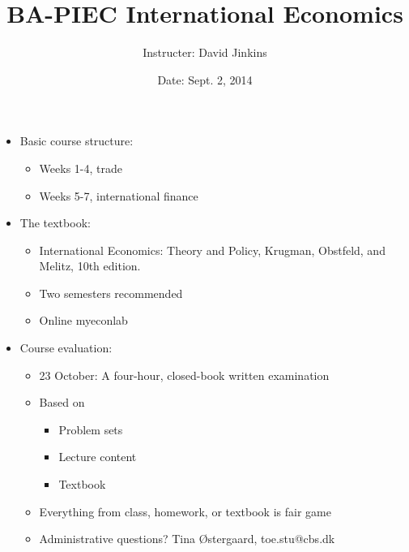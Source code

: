 \documentclass[ignorenonframetext,]{beamer}
\title{BA-PIEC International Economics}
\author{Instructer: David Jinkins}
\date{Date: Sept. 2, 2014}
\begin{document}
\frame{\titlepage}

\begin{frame}

\begin{itemize}
\itemsep1pt\parskip0pt
\item
  Basic course structure:

  \begin{itemize}
  \itemsep1pt\parskip0pt
  \item
    Weeks 1-4, trade
  \item
    Weeks 5-7, international finance
  \end{itemize}
\end{itemize}

\end{frame}

\begin{frame}

\begin{itemize}
\itemsep1pt\parskip0pt
\item
  The textbook:

  \begin{itemize}
  \itemsep1pt\parskip0pt
  \item
    International Economics: Theory and Policy, Krugman, Obstfeld, and
    Melitz, 10th edition.
  \item
    Two semesters recommended
  \item
    Online myeconlab
  \end{itemize}
\end{itemize}

\end{frame}

\begin{frame}

\begin{itemize}
\itemsep1pt\parskip0pt
\item
  Course evaluation:

  \begin{itemize}
  \itemsep1pt\parskip0pt
  \item
    23 October: A four-hour, closed-book written examination
  \item
    Based on

    \begin{itemize}
    \itemsep1pt\parskip0pt
    \item
      Problem sets
    \item
      Lecture content
    \item
      Textbook
    \end{itemize}
  \item
    Everything from class, homework, or textbook is fair game
  \item
    Administrative questions? Tina Østergaard, toe.stu@cbs.dk
  \end{itemize}
\end{itemize}

\end{frame}
\end{document}
